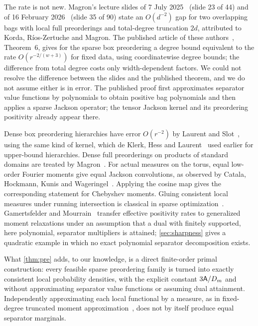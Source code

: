 \begin{remark}\label{rem:pre-prior}
The rate is not new. Magron's lecture slides of 7 July
2025~\cite{magron2025slides-lorentz} (slide 23 of 44) and of 16 February
2026~\cite{magron2026slides-tenors} (slide 35 of 90) state an $O(d^{-2})$
gap for two overlapping bags with local full preorderings and total-degree
truncation $2d$, attributed to Korda, Ríos-Zertuche and Magron. The
published article of these
authors~\cite{korda2025-convergence-rates-sparsity}, Theorem~6, gives for
the sparse box preordering a degree bound equivalent to the rate
$O(r^{-2/(w+3)})$ for fixed data, using coordinatewise degree bounds; the
difference from total degree costs only width-dependent factors. We could
not resolve the difference between the slides and the published theorem,
and we do not assume either is in error. The published proof first
approximates separator value functions by polynomials to obtain positive
bag polynomials and then applies a sparse Jackson operator; the tensor
Jackson kernel and its preordering positivity already appear there.

Dense box preordering hierarchies have error $O(r^{-2})$ by Laurent and
Slot~\cite{laurent2023-effective-schmudgen}, using the same kind of kernel,
which de Klerk, Hess and Laurent~\cite{dklerk2017-improved-upper-bounds}
used earlier for upper-bound hierarchies. Dense full preorderings on
products of standard domains are treated by
Magron~\cite{magron2026-convergence-rates-for-polynomial-optimization}. For
actual measures on the torus, equal low-order Fourier moments give equal
Jackson convolutions, as observed by Catala, Hockmann, Kunis and
Wageringel~\cite{catala2024-singular-measures}. Applying the cosine map gives
the corresponding statement for Chebyshev moments. Gluing consistent local
measures under running intersection is classical in sparse
optimization~\cite{lasserre2006-convergent-sdprelaxations-in-polynomial-optimization}.
Gamertsfelder and Mourrain~\cite{gamertsfelder2025-countable-gmp} transfer
effective positivity rates to generalized moment relaxations under an
assumption that a dual with finitely supported, here polynomial, separator
multipliers is attained; \cref{sec:sharpness} gives a quadratic example in
which no exact polynomial separator decomposition exists.

What \cref{thm:pre} adds, to our knowledge, is a direct finite-order
primal construction: every feasible sparse preordering family is turned
into exactly consistent local probability densities, with the explicit
constant $3\mathsf{A}/D_m$ and without approximating separator value functions
or assuming dual attainment. Independently approximating each local
functional by a measure, as in fixed-degree truncated moment
approximation~\cite{tran2026-truncated-moment-sequences}, does not by itself
produce equal separator marginals.
\end{remark}
